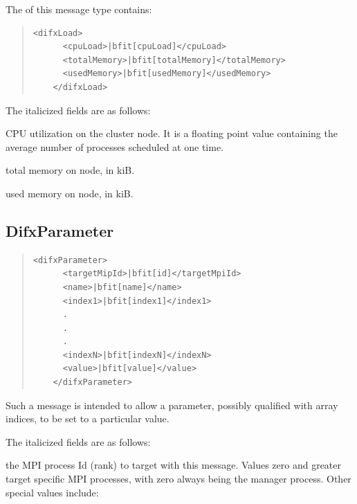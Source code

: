 \begin{description}
The  of this message type contains:

\begin{quotation}
\begin{Verbatim}[commandchars=\|\[\]]
    <difxLoad>
      <cpuLoad>|bfit[cpuLoad]</cpuLoad>
      <totalMemory>|bfit[totalMemory]</totalMemory>
      <usedMemory>|bfit[usedMemory]</usedMemory>
    </difxLoad>
\end{Verbatim}
\end{quotation}

\noindent The italicized fields are as follows:

\begin{description}
\item{} CPU utilization on the cluster node.  
It is a floating point value containing the average number of processes scheduled at one time.
\item{} total memory on node, in kiB.
\item{} used memory on node, in kiB.
\end{description}







\subsection{DifxParameter}

\begin{quotation} 
\begin{Verbatim}[commandchars=\|\[\]] 
    <difxParameter>
      <targetMipId>|bfit[id]</targetMpiId>
      <name>|bfit[name]</name>
      <index1>|bfit[index1]</index1>
      .
      .
      .
      <indexN>|bfit[indexN]</indexN>
      <value>|bfit[value]</value>
    </difxParameter>
\end{Verbatim}
\end{quotation}

Such a message is intended to allow a parameter, possibly qualified with array indices, to be set to a particular value.

\noindent The italicized fields are as follows:

\begin{description}
\item{} the MPI process Id (rank) to target with this message.
Values zero and greater target specific MPI processes, with zero always being the manager process.
Other special values include:


\end{description}
\end{description}
